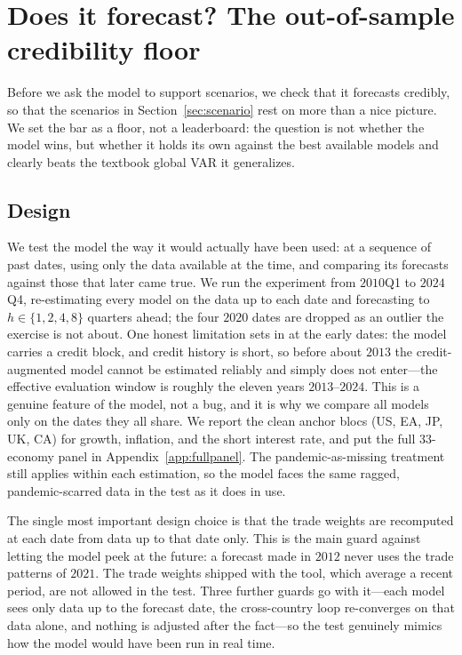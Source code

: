 \documentclass[11pt]{article}
\begin{document}
\section{Does it forecast? The out-of-sample credibility floor}
\label{sec:horserace}

Before we ask the model to support scenarios, we check that it forecasts credibly, so that the scenarios
in Section~\ref{sec:scenario} rest on more than a nice picture. We set the bar as a floor, not a
leaderboard: the question is not whether the model wins, but whether it holds its own against the best
available models and clearly beats the textbook global VAR it generalizes.

\subsection{Design}
\label{sub:eval-design}

We test the model the way it would actually have been used: at a sequence of past dates, using only the
data available at the time, and comparing its forecasts against those that later came true. We run the
experiment from $2010$Q1 to $2024$Q4, re-estimating every model on the data up to each date and
forecasting to $h\in\{1,2,4,8\}$ quarters ahead; the four $2020$ dates are dropped as an outlier the
exercise is not about. One honest limitation sets in at the early dates: the model carries a credit block,
and credit history is short, so before about $2013$ the credit-augmented model cannot be estimated
reliably and simply does not enter---the effective evaluation window is roughly the eleven years
$2013$--$2024$. This is a genuine feature of the model, not a bug, and it is why we compare all models only
on the dates they all share. We report the clean anchor blocs (US, EA, JP, UK, CA) for growth, inflation,
and the short interest rate, and put the full $33$-economy panel in Appendix~\ref{app:fullpanel}. The
pandemic-as-missing treatment still applies within each estimation, so the model faces the same ragged,
pandemic-scarred data in the test as it does in use.

The single most important design choice is that the trade weights are recomputed at each date from data
up to that date only. This is the main guard against letting the model peek at the future: a forecast made
in $2012$ never uses the trade patterns of $2021$. The trade weights shipped with the tool, which average
a recent period, are not allowed in the test. Three further guards go with it---each model sees only data
up to the forecast date, the cross-country loop re-converges on that data alone, and nothing is adjusted
after the fact---so the test genuinely mimics how the model would have been run in real time.
\end{document}
